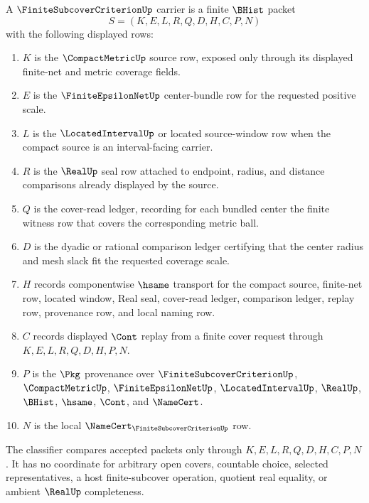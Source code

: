 \begin{definition}
\label{def:finite-subcover-criterion-carrier}
A $\FiniteSubcoverCriterionUp$ carrier is a finite $\BHist$ packet
$$
S=(K,E,L,R,Q,D,H,C,P,N)
$$
with the following displayed rows:
\begin{enumerate}
\item $K$ is the $\CompactMetricUp$ source row, exposed only through its displayed finite-net and metric coverage fields.
\item $E$ is the $\FiniteEpsilonNetUp$ center-bundle row for the requested positive scale.
\item $L$ is the $\LocatedIntervalUp$ or located source-window row when the compact source is an interval-facing carrier.
\item $R$ is the $\RealUp$ seal row attached to endpoint, radius, and distance comparisons already displayed by the source.
\item $Q$ is the cover-read ledger, recording for each bundled center the finite witness row that covers the corresponding metric ball.
\item $D$ is the dyadic or rational comparison ledger certifying that the center radius and mesh slack fit the requested coverage scale.
\item $H$ records componentwise $\hsame$ transport for the compact source, finite-net row, located window, Real seal, cover-read ledger, comparison ledger, replay row, provenance row, and local naming row.
\item $C$ records displayed $\Cont$ replay from a finite cover request through $K,E,L,R,Q,D,H,P,N$.
\item $P$ is the $\Pkg$ provenance over $\FiniteSubcoverCriterionUp$, $\CompactMetricUp$, $\FiniteEpsilonNetUp$, $\LocatedIntervalUp$, $\RealUp$, $\BHist$, $\hsame$, $\Cont$, and $\NameCert$.
\item $N$ is the local $\NameCert_{\FiniteSubcoverCriterionUp}$ row.
\end{enumerate}
The classifier compares accepted packets only through $K,E,L,R,Q,D,H,C,P,N$. It has no coordinate for arbitrary open covers, countable choice, selected representatives, a host finite-subcover operation, quotient real equality, or ambient $\RealUp$ completeness.
\end{definition}

